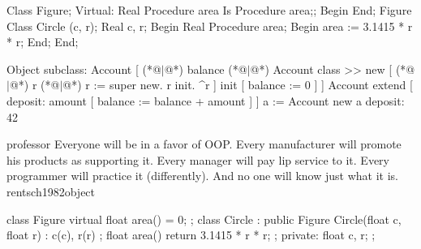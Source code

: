 \documentclass{article}
\begin{document}
\begin{ffcode}
Class Figure;
  Virtual: Real Procedure area Is Procedure area;;
Begin
End;
Figure Class Circle (c, r);
  Real c, r;
Begin
  Real Procedure area;
  Begin
    area := 3.1415 * r * r;
  End;
End;
\end{ffcode}
\plush{}


{\small\begin{ffcode}
Object subclass: Account [
    (*@\(\vert\)@*) balance (*@\(\vert\)@*)
    Account class >> new [
        (*@\(\vert\)@*) r (*@\(\vert\)@*)
        r := super new. r init. ^r
    ]
    init [ balance := 0 ]
]
Account extend [
    deposit: amount [ balance := balance + amount ]
]
a := Account new
a deposit: 42
\end{ffcode}
}
\plush{}

\lnQuote
  {professor}
  {Everyone will be in a favor of OOP. Every manufacturer will promote his products as supporting it. Every manager will pay lip service to it. Every programmer will practice it (differently). And no one will know just what it is.}
  {rentsch1982object}


\begin{ffcode}
class Figure {
  virtual float area() = 0;
};
class Circle : public Figure {
  Circle(float c, float r) : c(c), r(r) {};
  float area() { return 3.1415 * r * r; };
private:
  float c, r;
};
\end{ffcode}
\plush{}
\end{document}
